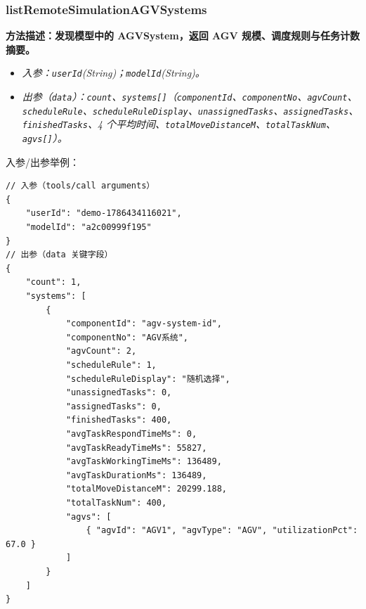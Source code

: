 \subsubsection{listRemoteSimulationAGVSystems}
\bf{方法描述}：发现模型中的 AGVSystem，返回 AGV 规模、调度规则与任务计数摘要。
\begin{itemize}
	\item \it{入参}：\texttt{userId}(String)；\texttt{modelId}(String)。
	\item \it{出参}（\texttt{data}）：\texttt{count}、\texttt{systems[]}（\texttt{componentId}、\texttt{componentNo}、\texttt{agvCount}、\texttt{scheduleRule}、\texttt{scheduleRuleDisplay}、\texttt{unassignedTasks}、\texttt{assignedTasks}、\texttt{finishedTasks}、4 个平均时间、\texttt{totalMoveDistanceM}、\texttt{totalTaskNum}、\texttt{agvs[]}）。
\end{itemize}
入参/出参举例：
\begin{lstlisting}
// 入参（tools/call arguments）
{
    "userId": "demo-1786434116021",
    "modelId": "a2c00999f195"
}
// 出参（data 关键字段）
{
    "count": 1,
    "systems": [
        {
            "componentId": "agv-system-id",
            "componentNo": "AGV系统",
            "agvCount": 2,
            "scheduleRule": 1,
            "scheduleRuleDisplay": "随机选择",
            "unassignedTasks": 0,
            "assignedTasks": 0,
            "finishedTasks": 400,
            "avgTaskRespondTimeMs": 0,
            "avgTaskReadyTimeMs": 55827,
            "avgTaskWorkingTimeMs": 136489,
            "avgTaskDurationMs": 136489,
            "totalMoveDistanceM": 20299.188,
            "totalTaskNum": 400,
            "agvs": [
                { "agvId": "AGV1", "agvType": "AGV", "utilizationPct": 67.0 }
            ]
        }
    ]
}
\end{lstlisting}\vspace{-30pt}

